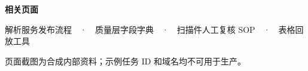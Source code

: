 \documentclass{article}
\begin{document}
\vspace{3mm}\colorbox{pale}{\parbox{96mm}{\vspace{3mm}\hspace{3mm}\textbf{相关页面}\par\hspace{3mm}\small 解析服务发布流程　·　质量层字段字典　·　扫描件人工复核 SOP　·　表格回放工具\vspace{3mm}}}\par
\vspace{5mm}
\noindent\hspace*{7mm}\parbox[t]{96mm}{\raggedright\color{gray}\scriptsize 页面截图为合成内部资料；示例任务 ID 和域名均不可用于生产。}\par
\vspace{4mm}
\end{document}
